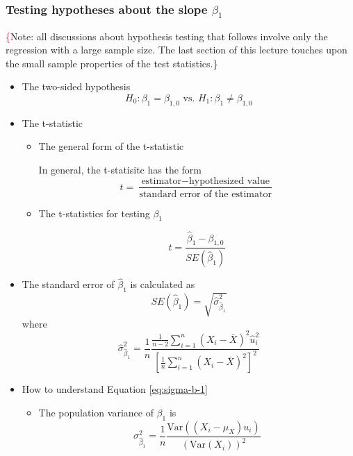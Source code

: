 \documentclass[a4paper,11pt]{article}
\newcommand{\var}{\mathrm{Var}}
\begin{document}
\subsubsection*{Testing hypotheses about the slope \(\beta_1\)}
\label{sec:org5736b08}
\begin{LaTeX}
\textcolor{red}\{Note: all discussions about hypothesis testing that
follows involve only the regression with a large sample size. The
last section of this lecture touches upon the small sample properties
of the test statistics.\}
\end{LaTeX}
\begin{itemize}
\item The two-sided hypothesis
\label{sec:org2b720dd}
\[ H_0: \beta_1 = \beta_{1,0} \text{ vs. } H_1: \beta_1 \neq \beta_{1,0} \]

\item The t-statistic
\label{sec:orgf223ad5}
\begin{itemize}
\item The general form of the t-statistic
\label{sec:org2e2d015}

In general, the t-statisitc has the form
\begin{equation}
\label{eq:general-t}
t = \frac{\text{estimator} - \text{hypothesized value}}{\text{standard error of the estimator}}
\end{equation}

\item The t-statistics for testing \(\beta_1\)
\label{sec:org0ac507d}

\begin{equation}
\label{eq:t-stat-b1}
t = \frac{\hat{\beta}_1 - \beta_{1,0}}{SE(\hat{\beta}_1)}
\end{equation}
\end{itemize}

\item The standard error of \(\hat{\beta}_1\) is calculated as
\label{sec:orgcd44438}
\begin{equation}
\label{eq:se-b-1}
SE(\hat{\beta}_1) = \sqrt{\hat{\sigma}^2_{\hat{\beta}_1}}
\end{equation}
where
\begin{equation}
\label{eq:sigma-b-1}
\hat{\sigma}^2_{\hat{\beta}_1} = \frac{1}{n} \frac{\frac{1}{n-2} \sum_{i=1}^n (X_i - \bar{X})^2 \hat{u}^2_i}{\left[ \frac{1}{n} \sum_{i=1}^n (X_i - \bar{X})^2 \right]^2}
\end{equation}

\item How to understand Equation \ref{eq:sigma-b-1}
\label{sec:orgf854442}
\begin{itemize}
\item The population variance of \(\beta_1\) is 
\[ \sigma^2_{\hat{\beta}_1} = \frac{1}{n} \frac{\var\left( (X_i - \mu_X)u_i \right)}{\left( \var(X_i) \right)^2} \]


\end{itemize}
\end{itemize}
\end{document}
